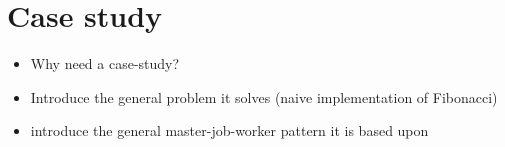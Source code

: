\chapter{Case study}

\begin{itemize}
	\item Why need a case-study?
	\item Introduce the general problem it solves (naive implementation of Fibonacci)
	\item introduce the general master-job-worker pattern it is based upon

\end{itemize}


